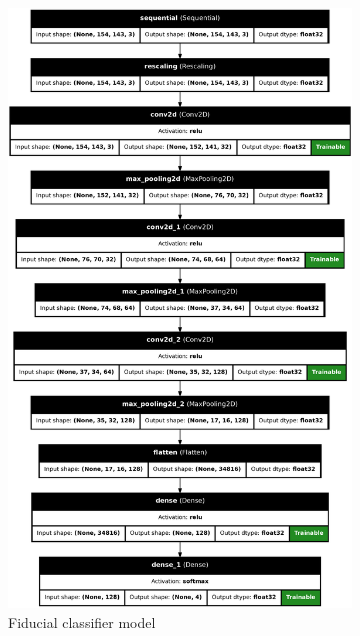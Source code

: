 \begin{figure}[H]
    \centering
    \begin{subfigure}{.5\textwidth}
        \centering
        \includegraphics[width=.8\textwidth]{../photos/fiducial_classifier_model}
        \caption[originalRainbow]{Fiducial classifier model}
        \label{fig:fiducial_classifier_model}
    \end{subfigure}%
    \begin{subfigure}{.5\textwidth}
        \centering

\end{subfigure}
\end{figure}
